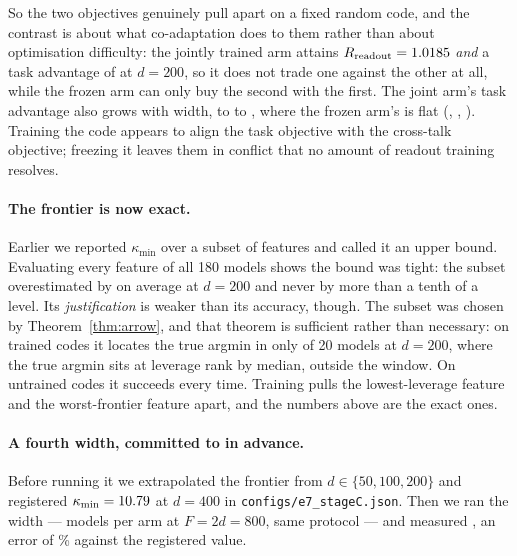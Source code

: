 \documentclass[preprint,12pt]{elsarticle}
\theoremstyle{definition}
\begin{document}
So the two objectives genuinely pull apart on a fixed random code, and the contrast is about what
co-adaptation does to them rather than about optimisation difficulty: the jointly trained arm attains
$R_{\mathrm{readout}}=1.0185{}$ \emph{and} a task advantage of
\EeightTrainedTwoHundredTaskGain{} at $d=200$, so it does not trade one against the other at all,
while the frozen arm can only buy the second with the first. The joint arm's task advantage also
grows with width, \EeightTrainedFiftyTaskGain{} to \EeightTrainedHundredTaskGain{} to
\EeightTrainedTwoHundredTaskGain{}, where the frozen arm's is flat
(\EeightFrozenFiftyTaskGain{}, \EeightFrozenHundredTaskGain{},
\EeightFrozenTwoHundredTaskGain{}). Training the code appears to align the task objective with the
cross-talk objective; freezing it leaves them in conflict that no amount of readout training
resolves.

\paragraph{The frontier is now exact.} Earlier we reported $\kappa_{\min}$ over a subset of features
and called it an upper bound. Evaluating every feature of all 180 models shows the bound was tight:
the subset overestimated by \FullLfourTwoHundredSubsetOver{} on average at $d=200$ and never by more
than a tenth of a level. Its \emph{justification} is weaker than its accuracy, though. The subset was
chosen by Theorem~\ref{thm:arrow}, and that theorem is sufficient rather than necessary: on trained
codes it locates the true argmin in only \FullLfourTwoHundredArgminFound{} of 20 models at $d=200$,
where the true argmin sits at leverage rank \FullLfourTwoHundredArgminRankMed{} by median, outside
the window. On untrained codes it succeeds every time. Training pulls the lowest-leverage feature and
the worst-frontier feature apart, and the numbers above are the exact ones.

\paragraph{A fourth width, committed to in advance.} Before running it we extrapolated the frontier
from $d\in\{50,100,200\}$ and registered $\kappa_{\min}=10.79$ at $d=400$ in
\texttt{configs/e7\_stageC.json}. Then we ran the width --- \ScSeeds{} models per arm at $F=2d=800$,
same protocol --- and measured \ScMeasured{}, an error of \ScRegisteredErrorPct\% against the
registered value.
\end{document}
